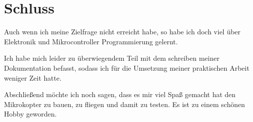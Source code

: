 \section{Schluss}
Auch wenn ich meine Zielfrage nicht erreicht habe,
so habe ich doch viel über Elektronik und
Mikrocontroller Programmierung gelernt.

Ich habe mich leider zu überwiegendem Teil mit dem schreiben meiner Dokumentation befasst,
sodass ich für die Umsetzung meiner praktischen Arbeit weniger Zeit hatte.

Abschließend möchte ich noch sagen, dass es mir viel Spaß gemacht
hat den Mikrokopter zu bauen, zu fliegen und damit zu testen.
Es ist zu einem schönen Hobby geworden.
